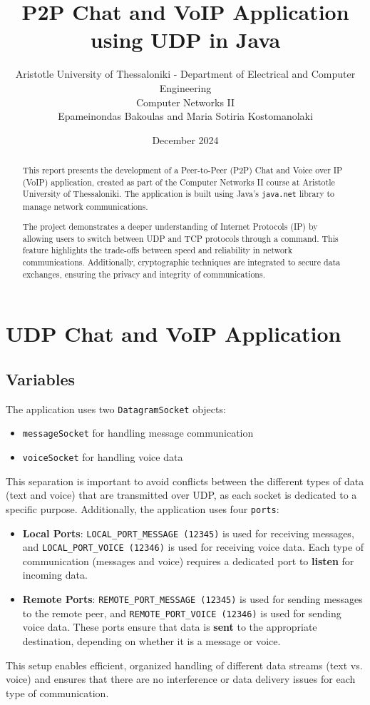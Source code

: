 \documentclass{article}
\title{P2P Chat and VoIP Application using UDP in Java}
\author{
    \small Aristotle University of Thessaloniki - Department of Electrical and Computer Engineering \\[0.5em]
    \small Computer Networks II\\[1.5em]
    Epameinondas Bakoulas and Maria Sotiria Kostomanolaki \\[1em]
}
\date{December 2024}
\begin{document}
\maketitle

\begin{abstract}
This report presents the development of a Peer-to-Peer (P2P) Chat and Voice over IP (VoIP) application, created as part of the 
Computer Networks II course at Aristotle University of Thessaloniki. The application is built using Java's \texttt{java.net} 
library to manage network communications. 

The project demonstrates a deeper understanding of Internet Protocols (IP) by allowing users to switch between UDP and TCP protocols 
through a command. This feature highlights the trade-offs between speed and reliability in network communications. 
Additionally, cryptographic techniques are integrated to secure data exchanges, ensuring the privacy and integrity of communications.
\end{abstract}

\section {UDP Chat and VoIP Application}

\subsection{Variables}
The application uses two \texttt{DatagramSocket} objects:
\begin{itemize}
    \item \texttt{messageSocket} for handling message communication
    \item \texttt{voiceSocket} for handling voice data
\end{itemize}
This separation is important to avoid conflicts between the different types of data (text and voice) that are transmitted over UDP, 
as each socket is dedicated to a specific purpose. Additionally, the application uses four \texttt{ports}:
\begin{itemize}
    \item \textbf{Local Ports}: \texttt{LOCAL\_PORT\_MESSAGE (12345)} is used for receiving messages, and \texttt{LOCAL\_PORT\_VOICE (12346)} is used 
    for receiving voice data. Each type of communication (messages and voice) requires a dedicated port to \textbf{listen} for incoming data.
    \item \textbf{Remote Ports}: \texttt{REMOTE\_PORT\_MESSAGE (12345)} is used for sending messages to the remote peer, and \texttt{REMOTE\_PORT\_VOICE (12346)} 
    is used for sending voice data. These ports ensure that data is \textbf{sent} to the appropriate destination, depending on whether it is a message or voice.
\end{itemize}
This setup enables efficient, organized handling of different data streams (text vs. voice) and ensures that there are no interference or 
data delivery issues for each type of communication.
\end{document}
